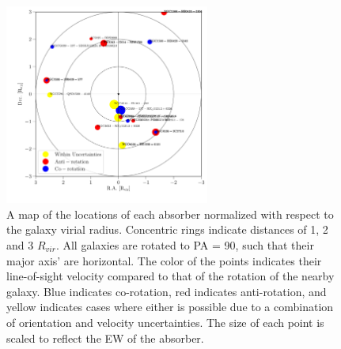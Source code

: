 \documentclass[iop]{emulateapj-rtx4}
\begin{document}
\begin{figure}[ht!]
        \centering
        \vspace{0pt}
        \includegraphics[width=0.60\textwidth]{SALT_map2.pdf}
        \caption{\small{A map of the locations of each absorber normalized with respect to the galaxy virial radius. Concentric rings indicate distances of 1, 2 and 3 $R_{vir}$. All galaxies are rotated to PA = 90, such that their major axis' are horizontal. The color of the points indicates their line-of-sight velocity compared to that of the rotation of the nearby galaxy. Blue indicates co-rotation, red indicates anti-rotation, and yellow indicates cases where either is possible due to a combination of orientation and velocity uncertainties. The size of each point is scaled to reflect the EW of the absorber. }}
        \label{map}
\end{figure}


\end{document}
